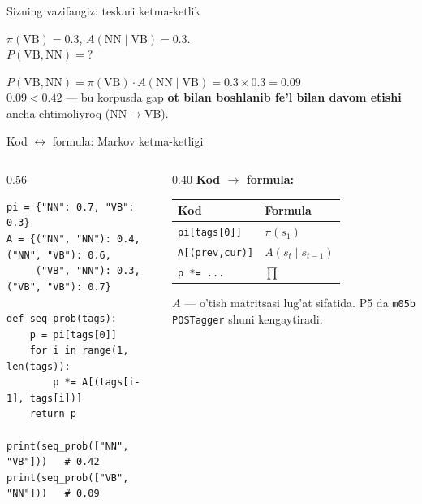\documentclass[aspectratio=169,11pt]{beamer}
\begin{document}
\begin{frame}{Sizning vazifangiz: teskari ketma-ketlik}
  \begin{tcolorbox}[warnbox,title=Savol --- 60 soniya]
    \small
    $\pi(\text{VB})=0.3$, \quad $A(\text{NN}\mid\text{VB})=0.3$.\\[4pt]
    \textbf{\large $P(\text{VB},\text{NN}) = ?$}
  \end{tcolorbox}
  \pause
  \begin{tcolorbox}[okbox,title=Javob]
    \small
    $P(\text{VB},\text{NN}) = \pi(\text{VB})\cdot A(\text{NN}\mid\text{VB})
       = 0.3 \times 0.3 = \mathbf{0.09}$\\[3pt]
    \footnotesize $0.09 < 0.42$ --- bu korpusda gap \textbf{ot bilan boshlanib
    fe'l bilan davom etishi} ancha ehtimoliyroq (NN$\to$VB).
  \end{tcolorbox}
\end{frame}

\begin{frame}[fragile]{Kod $\leftrightarrow$ formula: Markov ketma-ketligi}
  \begin{columns}[T]
    \begin{column}{0.56\textwidth}
\begin{lstlisting}
pi = {"NN": 0.7, "VB": 0.3}
A = {("NN", "NN"): 0.4, ("NN", "VB"): 0.6,
     ("VB", "NN"): 0.3, ("VB", "VB"): 0.7}

def seq_prob(tags):
    p = pi[tags[0]]
    for i in range(1, len(tags)):
        p *= A[(tags[i-1], tags[i])]
    return p

print(seq_prob(["NN", "VB"]))   # 0.42
print(seq_prob(["VB", "NN"]))   # 0.09
\end{lstlisting}
    \end{column}
    \begin{column}{0.40\textwidth}
      \textbf{Kod $\to$ formula:}\\[3pt]
      \footnotesize
      \begin{tabular}{p{1.9cm}p{2.1cm}}
        \toprule
        Kod & Formula \\
        \midrule
        \texttt{pi[tags[0]]} & $\pi(s_1)$ \\
        \texttt{A[(prev,cur)]} & $A(s_t{\mid}s_{t-1})$ \\
        \texttt{p *= ...} & $\prod$ \\
        \bottomrule
      \end{tabular}
      \vspace{4pt}
      \begin{tcolorbox}[okbox,top=2pt,bottom=2pt]
        \footnotesize
        $A$ --- o'tish matritsasi lug'at sifatida. P5 da \texttt{m05b POSTagger}
        shuni kengaytiradi.
      \end{tcolorbox}
    \end{column}
  \end{columns}
\end{frame}
\end{document}
